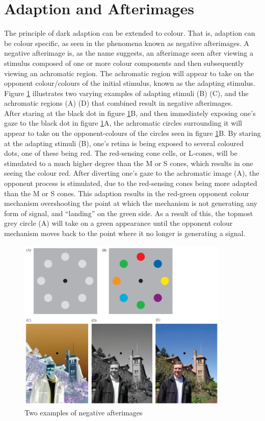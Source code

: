 \documentclass[a4paper,12pt,titlepage, oneside]{article}
\begin{document}
\section{Adaption and Afterimages}
The principle of dark adaption \cite{lightanddark} 
can be extended to colour. That is, adaption can 
be colour specific, as seen in the phenomena known as 
negative afterimages. A negative afterimage is, as the 
name suggests, an afterimage seen after viewing a stimulus 
composed of one or more colour components and then subsequently 
viewing an achromatic region. The achromatic region will appear 
to take on the opponent colour/colours of the initial stimulus, 
known as the adapting stimulus. Figure \ref{afterimages} illustrates two varying 
examples of adapting stimuli (B) (C), and the achromatic regions 
(A) (D) that combined result in negative afterimages.\\
After staring at the black dot in figure \ref{afterimages}B, and then immediately 
exposing one’s gaze to the black dot in figure \ref{afterimages}A, the achromatic 
circles surrounding it will appear to take on the opponent-colours 
of the circles seen in figure \ref{afterimages}B. 
By staring at the adapting stimuli (B), 
one’s retina is being exposed to several coloured dots, one of 
these being red. The red-sensing cone cells, or L-cones, will 
be stimulated to a much higher degree than the M or S cones, which 
results in one seeing the colour red. After diverting one’s gaze 
to the achromatic image (A), the opponent process is stimulated, 
due to the red-sensing cones being more adapted than the M or S cones. \cite{SPCbook} 
This adaption results in the red-green opponent colour mechanism 
overshooting the point at which the mechanism is not generating 
any form of signal, and “landing” on the green side. \cite{SPCbook} As a 
result of this, the topmost grey circle (A) will take on a 
green appearance until the opponent colour mechanism moves 
back to the point where it no longer is generating a signal.\\
\begin{figure}[h!]
        \centering
        \includegraphics[width=0.9\textwidth]{afterimages}
        \caption{Two examples of negative afterimages \cite{SPCbook}}
\label{afterimages}
\end{figure}

\cleardoublepage


\end{document}
